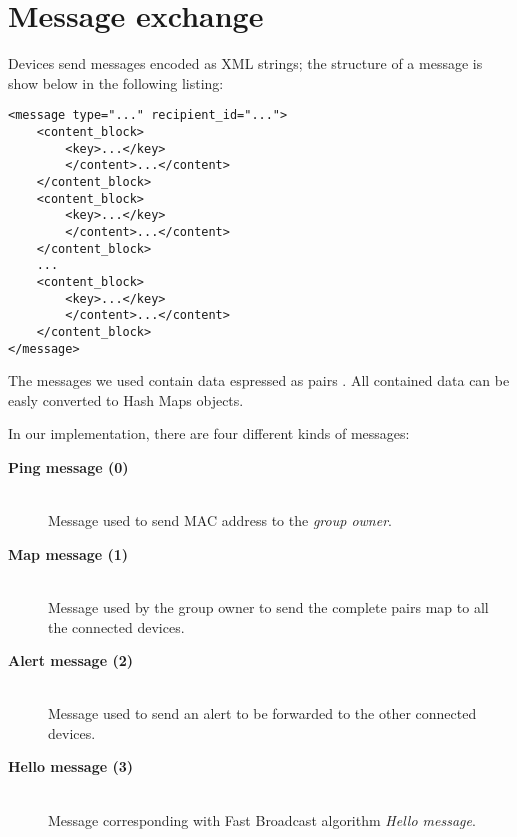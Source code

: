 \section{Message exchange}

Devices send messages encoded as XML strings; the structure of a message is show below in the following listing:
\begin{verbatim}
<message type="..." recipient_id="...">
    <content_block>
        <key>...</key>
        </content>...</content>
    </content_block>
    <content_block>
        <key>...</key>
        </content>...</content>
    </content_block>
    ...
    <content_block>
        <key>...</key>
        </content>...</content>
    </content_block>
</message>
\end{verbatim}
The messages we used contain data espressed as pairs . All contained data can be easly converted to Hash Maps objects.

In our implementation, there are four different kinds of messages:
	\begin{description}
		\item[\textbf{Ping message (0)}] \hfill \\
		Message used to send MAC address to the \textit{group owner}.
		\item[\textbf{Map message (1)}] \hfill \\
		Message used by the group owner to send the complete  pairs map to all the connected devices.
		\item[\textbf{Alert message (2)}] \hfill \\
		Message used to send an alert to be forwarded to the other connected devices.
		\item[\textbf{Hello message (3)}] \hfill \\
		Message corresponding with Fast Broadcast algorithm \textit{Hello message}.
	\end{description}
